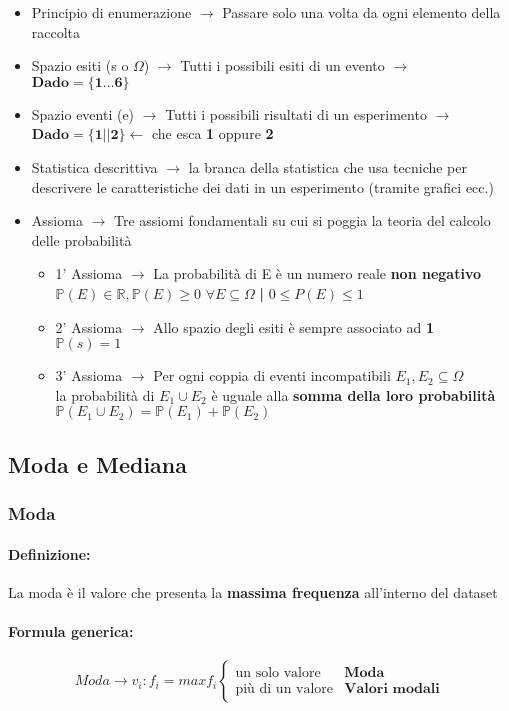 \documentclass[]{article}
\newcommand{\definizione}{\paragraph{Definizione:}}
\newcommand{\formula}{\paragraph{Formula generica:}}
\begin{document}
\begin{itemize}
        \item Principio di enumerazione $\rightarrow$ Passare solo una volta da ogni elemento della raccolta
        \item Spazio esiti (s o $\Omega$) $\rightarrow$ Tutti i possibili esiti di un evento $\rightarrow$ $\boldsymbol{Dado=\{1 \ldots 6\}}$
        \item Spazio eventi (e) $\rightarrow$ Tutti i possibili risultati di un esperimento $\rightarrow$ $\boldsymbol{Dado=\{1||2\}} \leftarrow$ che esca \textbf{1} oppure \textbf{2}
        \item Statistica descrittiva $\rightarrow$ la branca della statistica che usa tecniche per descrivere le caratteristiche dei dati in un esperimento (tramite grafici ecc.)
        \item Assioma $\rightarrow$ Tre assiomi fondamentali su cui si poggia la teoria del calcolo delle probabilità
        \begin{itemize}
            \item 1' Assioma $\rightarrow$ La probabilità di E è un numero reale \textbf{non negativo} $\mathbb{P}(E) \in \mathbb{R}, \mathbb{P}(E) \geq 0$ $ \forall E \subseteq \Omega $ \space \textbf{|} \space $0 \leq P(E) \leq 1$
            \item 2' Assioma $\rightarrow$ Allo spazio degli esiti è sempre associato ad \textbf{1} \\ $\mathbb{P}(s) = 1$
            \item 3' Assioma $\rightarrow$ Per ogni coppia di eventi incompatibili $E_1, E_2 \subseteq \Omega$ \\ la probabilità di $E_1 \cup E_2$ è uguale alla \textbf{somma della loro probabilità} \\ $\mathbb{P}(E_1 \cup E_2) = \mathbb{P}(E_1) + \mathbb{P}(E_2)$
        \end{itemize} 
    \end{itemize}
    \newpage 

    \subsection{Moda e Mediana}
    \subsubsection{Moda}
    \definizione La moda è il valore che presenta la \textbf{massima frequenza} all'interno del dataset
    \formula
    \begin{equation*}
        Moda \rightarrow v_i : f_i = max f_i
        \begin{cases}
            \text{un solo valore} & \textbf{Moda} \\
            \text{più di un valore} & \textbf{Valori modali}
        \end{cases}
    \end{equation*}
\end{document}
